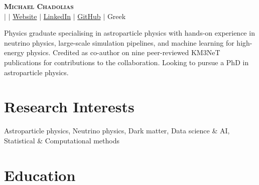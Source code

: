 \documentclass[letterpaper,11pt]{article}
\begin{document}

\begin{center}
    \textbf{\Huge \scshape Michael Chadolias} \\ \vspace{3pt}
    \small
    \faMobile \hspace{.5pt} \href{tel:\mobile}{\mobile}
    $|$
    \faAt \hspace{.5pt} \href{mailto:\email}{\email}
    $|$
    \faGlobe \hspace{.5pt} \href{\website}{Website}
    $|$
    \faLinkedinSquare \hspace{.5pt} \href{\linkedin}{LinkedIn}
    $|$
    \faGithub \hspace{.5pt} \href{\gitprofile}{GitHub}
    $|$
    \faMap \hspace{.5pt} Greek
\end{center}

Physics graduate specialising in astroparticle physics with hands-on experience in neutrino physics, large-scale simulation pipelines, and machine learning for high-energy physics. Credited as co-author on nine peer-reviewed KM3NeT publications for contributions to the collaboration. Looking to pursue a PhD in astroparticle physics.
\vspace{1.5pt}


\section{Research Interests}
  \vspace{2pt}
  \resumeSubHeadingListStart
    \small{\item{
        {Astroparticle physics, Neutrino physics, Dark matter, Data science \& AI, Statistical \& Computational methods} 
    }}
  \resumeSubHeadingListEnd

\section{Education}
  \vspace{3pt}
  \resumeSubHeadingListStart
    
\end{document}
